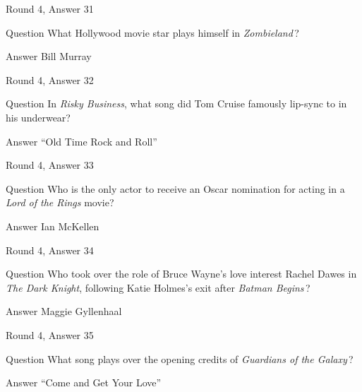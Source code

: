 \documentclass[11pt]{beamer}
\begin{document}
\begin{frame}[t]{Round 4, Answer 31}
\vspace{2em}
\begin{block}{Question}
What Hollywood movie star plays himself in \emph{Zombieland}\,?
\end{block}
\pause{}
\begin{block}{Answer}
Bill Murray
\end{block}
\end{frame}
    

\begin{frame}[t]{Round 4, Answer 32}
\vspace{2em}
\begin{block}{Question}
In \emph{Risky Business}, what song did Tom Cruise famously lip-sync to in his underwear?
\end{block}
\pause{}
\begin{block}{Answer}
``Old Time Rock and Roll''
\end{block}
\end{frame}
    

\begin{frame}[t]{Round 4, Answer 33}
\vspace{2em}
\begin{block}{Question}
Who is the only actor to receive an Oscar nomination for acting in a \emph{Lord of the Rings} movie?
\end{block}
\pause{}
\begin{block}{Answer}
Ian McKellen
\end{block}
\end{frame}
    

\begin{frame}[t]{Round 4, Answer 34}
\vspace{2em}
\begin{block}{Question}
Who took over the role of Bruce Wayne's love interest Rachel Dawes in \emph{The Dark Knight}, following Katie Holmes's exit after \emph{Batman Begins}\,?
\end{block}
\pause{}
\begin{block}{Answer}
Maggie Gyllenhaal
\end{block}
\end{frame}
    

\begin{frame}[t]{Round 4, Answer 35}
\vspace{2em}
\begin{block}{Question}
What song plays over the opening credits of \emph{Guardians of the Galaxy}\,?
\end{block}
\pause{}
\begin{block}{Answer}
``Come and Get Your Love''
\end{block}
\end{frame}
    
\end{document}
